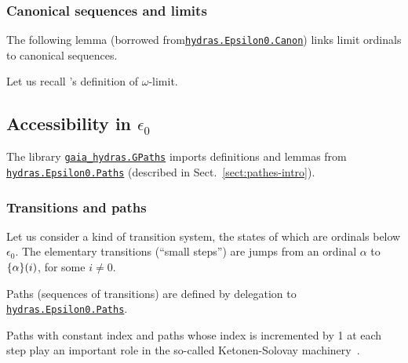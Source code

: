 \subsubsection{Canonical sequences and limits}

The following lemma (borrowed from\href{../theories/html/hydras.Epsilon0.Canon.html}%
{\texttt{hydras.Epsilon0.Canon}}) links limit ordinals to canonical sequences.


Let us recall \gaia's definition of $\omega$-limit.



\subsection{Accessibility in \texorpdfstring{$\epsilon_0$}{epsilon\_0}}
\label{sect:gpath}

The library \href{../theories/html/gaia_hydras.GPaths.html}%
{\texttt{gaia\_hydras.GPaths}} imports definitions and lemmas from
\href{../theories/html/hydras.Epsilon0.Paths.html}%
{\texttt{hydras.Epsilon0.Paths}} (described in Sect.~\ref{sect:pathes-intro}).


\subsubsection{Transitions and paths}
Let us consider a kind of transition system, the states of which are ordinals below $\epsilon_0$. The elementary transitions (``small steps'') are jumps from an ordinal $\alpha$ to $\mbox{$\{\alpha\}(i)$}$, for some $i\not=0$.


Paths (sequences of transitions) are defined by delegation to
\href{../theories/html/hydras.Epsilon0.Paths.html}%
{\texttt{hydras.Epsilon0.Paths}}.


 Paths with constant index and paths whose index is incremented by 1 at each step play an important role in the so-called Ketonen-Solovay machinery~\cite{KS81}.


